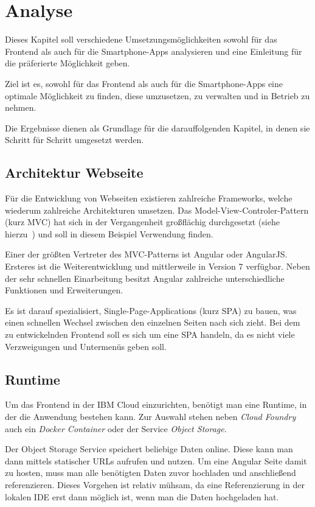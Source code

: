 \section{Analyse}
Dieses Kapitel soll verschiedene Umsetzungsmöglichkeiten sowohl für das Frontend als auch für die Smartphone-Apps
analysieren und eine Einleitung für die präferierte Möglichkeit geben.

Ziel ist es, sowohl für das Frontend als auch für die Smartphone-Apps eine optimale Möglichkeit zu finden, diese
umzusetzen, zu verwalten und in Betrieb zu nehmen.

Die Ergebnisse dienen als Grundlage für die darauffolgenden Kapitel, in denen sie Schritt für Schritt umgesetzt werden.

\subsection{Architektur Webseite}
Für die Entwicklung von Webseiten existieren zahlreiche Frameworks, welche wiederum zahlreiche Architekturen umsetzen.
Das Model-View-Controler-Pattern (kurz MVC) hat sich in der Vergangenheit großflächig durchgesetzt (siehe
hierzu~\cite{book_grundlagen_mvc}) und soll in diesem Beispiel Verwendung finden.

Einer der größten Vertreter des MVC-Patterns ist Angular oder AngularJS. Ersteres ist die Weiterentwicklung und
mittlerweile in Version 7 verfügbar. Neben der sehr schnellen Einarbeitung besitzt Angular zahlreiche unterschiedliche
Funktionen und Erweiterungen.

Es ist darauf spezialisiert, Single-Page-Applications (kurz SPA) zu bauen, was einen schnellen Wechsel zwischen den
einzelnen Seiten nach sich zieht. Bei dem zu entwickelnden Frontend soll es sich um eine SPA handeln, da es nicht viele
Verzweigungen und Untermenüs geben soll.

\subsection{Runtime}
Um das Frontend in der IBM Cloud einzurichten, benötigt man eine Runtime, in der die Anwendung bestehen kann. Zur
Auswahl stehen neben \textit{Cloud Foundry} auch ein \textit{Docker Container} oder der Service \textit{Object Storage}.

Der Object Storage Service speichert beliebige Daten online. Diese kann man dann mittels statischer URLs aufrufen und
nutzen. Um eine Angular Seite damit zu hosten, muss man alle benötigten Daten zuvor hochladen und anschließend
referenzieren. Dieses Vorgehen ist relativ mühsam, da eine Referenzierung in der lokalen IDE erst dann möglich ist, wenn
man die Daten hochgeladen hat.

